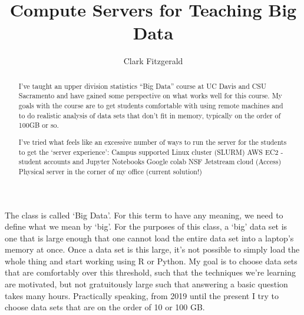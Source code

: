 \documentclass{article}
\title{Compute Servers for Teaching Big Data}
\author{Clark Fitzgerald}
\begin{document}
\maketitle

\begin{abstract}

I’ve taught an upper division statistics ``Big Data'' course at UC Davis and CSU Sacramento and have gained some perspective on what works well for this course.
My goals with the course are to get students comfortable with using remote machines and to do realistic analysis of data sets that don’t fit in memory, typically on the order of 100GB or so.
 
I’ve tried what feels like an excessive number of ways to run the server for the students to get the `server experience':
Campus supported Linux cluster (SLURM)
AWS EC2 - student accounts and Jupyter Notebooks
Google colab
NSF Jetstream cloud (Access)
Physical server in the corner of my office (current solution!)

\end{abstract}

The class is called `Big Data'.
For this term to have any meaning, we need to define what we mean by `big'.
For the purposes of this class, a `big' data set is one that is large enough that one cannot load the entire data set into a laptop's memory at once.
Once a data set is this large, it's not possible to simply load the whole thing and start working using R or Python.
My goal is to choose data sets that are comfortably over this threshold, such that the techniques we're learning are motivated, but not gratuitously large such that answering a basic question takes many hours.
Practically speaking, from 2019 until the present I try to choose data sets that are on the order of 10 or 100 GB.
\end{document}
